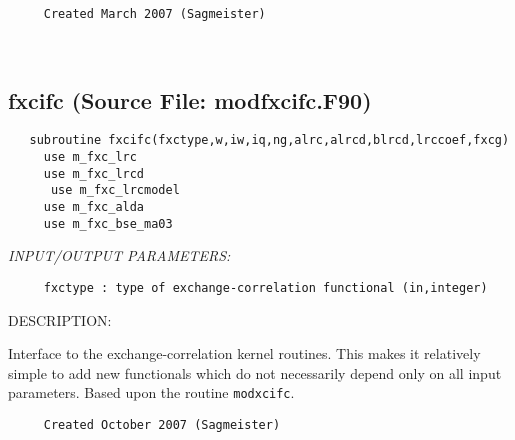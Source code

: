 \documentclass[11pt]{article}
\begin{document}
\begin{verbatim}     Created March 2007 (Sagmeister)\end{verbatim}














 
 
\mbox{}\hrulefill\ 
 
\subsection{fxcifc (Source File: modfxcifc.F90)}


\begin{verbatim}   subroutine fxcifc(fxctype,w,iw,iq,ng,alrc,alrcd,blrcd,lrccoef,fxcg)
     use m_fxc_lrc
     use m_fxc_lrcd
      use m_fxc_lrcmodel
     use m_fxc_alda
     use m_fxc_bse_ma03\end{verbatim}{\em INPUT/OUTPUT PARAMETERS:}
\begin{verbatim}     fxctype : type of exchange-correlation functional (in,integer)\end{verbatim}
{\sf DESCRIPTION:\\ }


     Interface to the exchange-correlation kernel routines. This makes it 
     relatively
     simple to add new functionals which do not necessarily depend only on
     all input parameters. Based upon the routine {\tt modxcifc}.
  
\begin{verbatim}     Created October 2007 (Sagmeister)\end{verbatim}
 
\end{document}
